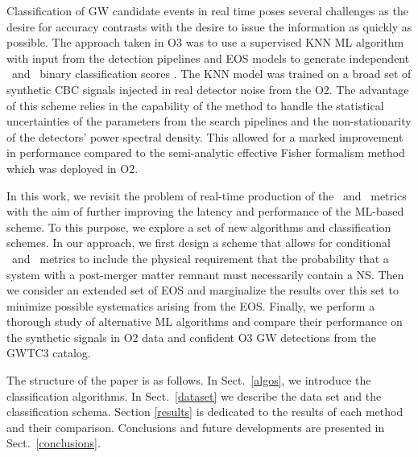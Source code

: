 Classification of \ac{GW} candidate events in real time poses several challenges as the desire for accuracy contrasts with the desire to issue the information as
quickly as possible. The approach taken in \ac{O3} was to use a supervised \ac{KNN} \cite{Pedregosa:2011ork} \ac{ML} algorithm with input from the detection pipelines
and \ac{EOS} models to generate independent \hasns\ and \hasrem\ binary classification scores \cite{Chatterjee:2019avs}. The \ac{KNN} model was trained on a broad set
of synthetic \ac{CBC} signals injected in real detector noise from the \ac{O2}. The advantage of this scheme relies in the capability of the method to handle the
statistical uncertainties of the parameters from the search pipelines and the non-stationarity of the detectors' power spectral density. This allowed for a marked
improvement in performance compared to the semi-analytic effective Fisher formalism method which was deployed in \ac{O2}.

In this work, we revisit the problem of real-time production of the \hasns\ and \hasrem\ metrics with the aim of further improving the latency and performance of the
\ac{ML}-based scheme. To this purpose, we explore a set of new algorithms and classification schemes. In our approach, we first design a scheme that allows for
conditional \hasns\ and \hasrem\ metrics to include the physical requirement that the probability that a system with a post-merger matter remnant must necessarily
contain a \ac{NS}. Then we consider an extended set of \ac{EOS} and marginalize the results over this set to minimize possible systematics arising from the \ac{EOS}.
Finally, we perform a thorough study of alternative \ac{ML} algorithms and compare their performance on the synthetic signals in \ac{O2} data and confident \ac{O3}
\ac{GW} detections from the \ac{GWTC3} catalog.

The structure of the paper is as follows. In Sect.~\ref{algos}, we introduce the classification algorithms. In Sect.~\ref{dataset} we describe the data set and the
classification schema. Section \ref{results} is dedicated to the results of each method and their comparison. Conclusions and future developments are presented in
Sect.~\ref{conclusions}.

